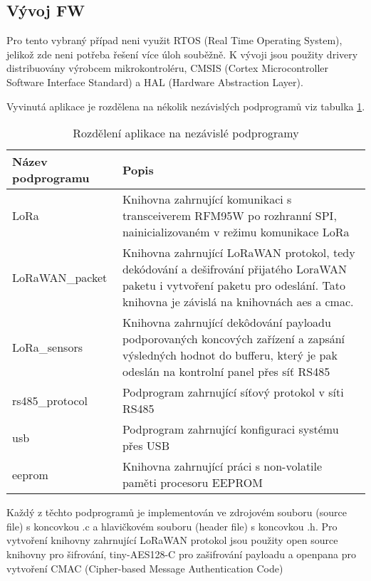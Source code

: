 \subsection{Vývoj FW}
Pro tento vybraný případ neni využit RTOS (Real Time Operating System), jelikož zde neni potřeba řešení více úloh souběžně. 
K vývoji jsou použity drivery distribuovány výrobcem mikrokontroléru, CMSIS (Cortex Microcontroller Software Interface Standard) a HAL (Hardware Abstraction Layer).

Vyvinutá aplikace je rozdělena na nékolik nezávislých podprogramů viz tabulka \ref{table:sw_div}. 

\begin{table}[!h]
    \centering
    \begin{ctucolortab}
            \begin{tabular}{ |l|p{8cm}| }
     \hline

     Název podprogramu  & Popis           \\ \hline \hline

    LoRa            &  Knihovna zahrnující komunikaci s transceiverem RFM95W po rozhranní SPI, nainicializovaném v režimu komunikace LoRa    \\ \hline
    LoRaWAN\_packet  & Knihovna zahrnující LoRaWAN protokol, tedy dekódování a dešifrování přijatého LoraWAN paketu i vytvoření paketu pro odeslání. Tato knihovna je závislá na knihovnách aes a cmac.  \\ \hline
    LoRa\_sensors    & Knihovna zahrnující dekôdování payloadu podporovaných koncových zařízení a zapsání výsledných hodnot do bufferu, který je pak odeslán na kontrolní panel přes síť RS485       \\ \hline
    rs485\_protocol  & Podprogram zahrnující síťový protokol v síti RS485         \\ \hline
    usb             &  Podprogram zahrnující konfiguraci systému přes USB        \\ \hline
    eeprom          &  Knihovna zahrnující práci s non-volatile paměti procesoru EEPROM     \\ \hline

    \end{tabular}
    \end{ctucolortab}
    \caption{Rozdělení aplikace na nezávislé podprogramy}
    \label{table:sw_div}
\end{table}

Každý z těchto podprogramů je implementován ve zdrojovém souboru (source file) s koncovkou .c a hlavičkovém souboru (header file) s koncovkou .h.
Pro vytvoření knihovny zahrnující LoRaWAN protokol jsou použity open source knihovny pro šifrování, tiny-AES128-C \cite{lib_tiny-AES128-C} pro zašifrování payloadu a openpana \cite{lib_openpana} pro vytvoření CMAC (Cipher-based Message Authentication Code)


